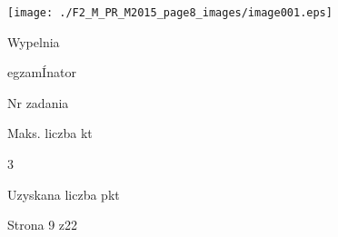 \documentclass[a4paper,12pt]{article}
\begin{document}
\begin{center}
\texttt{[image: ./F2\_M\_PR\_M2015\_page8\_images/image001.eps]}
\end{center}
Wypelnia

egzamÍnator

Nr zadania

Maks. liczba kt

3

Uzyskana liczba pkt

Strona 9 z22
\end{document}
